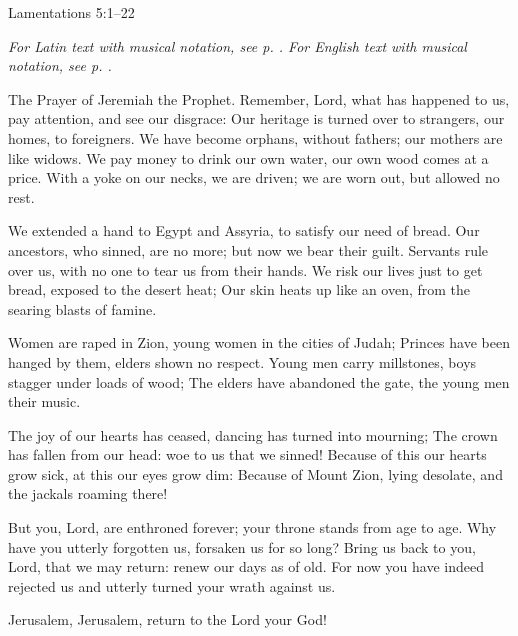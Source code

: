 \hfill Lamentations 5:1–22
\par\vspace{5pt}
\textit{For Latin text with musical notation, see p. \pageref{Oratio Ieremiæ}. For English text with musical notation, see p. \pageref{Prayer of Jeremiah}.}
\par\vspace{5pt}

The Prayer of Jeremiah the Prophet. Remember, Lord, what has happened to us,
    pay attention, and see our disgrace:
Our heritage is turned over to strangers,
    our homes, to foreigners.
We have become orphans, without fathers;
    our mothers are like widows.
We pay money to drink our own water,
    our own wood comes at a price.
With a yoke on our necks, we are driven;
    we are worn out, but allowed no rest.

We extended a hand to Egypt and Assyria,
    to satisfy our need of bread.
Our ancestors, who sinned, are no more;
    but now we bear their guilt.
Servants rule over us,
    with no one to tear us from their hands.
We risk our lives just to get bread,
    exposed to the desert heat;
Our skin heats up like an oven,
    from the searing blasts of famine.

Women are raped in Zion,
    young women in the cities of Judah;
Princes have been hanged by them,
    elders shown no respect.
Young men carry millstones,
    boys stagger under loads of wood;
The elders have abandoned the gate,
    the young men their music.

The joy of our hearts has ceased,
    dancing has turned into mourning;
The crown has fallen from our head:
    woe to us that we sinned!
Because of this our hearts grow sick,
    at this our eyes grow dim:
Because of Mount Zion, lying desolate,
    and the jackals roaming there!

But you, Lord, are enthroned forever;
    your throne stands from age to age.
Why have you utterly forgotten us,
    forsaken us for so long?
Bring us back to you, Lord, that we may return:
    renew our days as of old.
For now you have indeed rejected us
    and utterly turned your wrath against us.
    
    Jerusalem, Jerusalem, return to the Lord your God!

